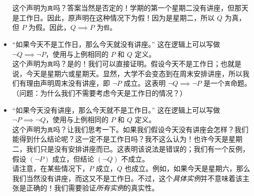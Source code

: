 \begin{example}
\begin{itemize}
            这个声明为\verb|真|吗？答案当然是否定的！学期的第一个星期二没有讲座，但那天是工作日。因此，原声明在这种情况下为假！因为是星期二，所以 $Q$ 为真，但 $P$ 为假。因此，$Q \implies P$ 为\verb|假|。
        \item ``如果今天不是工作日，那么今天就没有讲座。''
            这在逻辑上可以写做 $\neg Q \implies \neg P$，使用与上例相同的 $P$ 和 $Q$ 定义。\\
            这个声明为\verb|真|吗？是的！我们可以直接证明。假设今天不是工作日；也就是说，今天是星期六或星期天。显然，大学不会变态到在周末安排讲座，所以我们有理由声明周末没有讲座，即 $\neg P$ 成立。这表明 $\neg Q \implies \neg P$ 是一个\verb|真|命题。\\
            （问题：为什么我们不需要考虑今天是工作日的情况？）
        \item ``如果今天没有讲座，那么今天就不是工作日。''
            这在逻辑上可以写做 $\neg P \implies \neg Q$，使用与上例相同的 $P$ 和 $Q$ 定义。\\
            这个声明为\verb|真|吗？让我们思考一下。如果我们假设今天没有讲座会怎样？我们能得到什么结论呢？这一定不是工作日吗？我不这么认为！也许今天是星期二，我们只是没有安排讲座而已。这表明该说法是错误的；我们有一个反例，假设 $(\neg P)$ 成立，但结论 $(\neg Q)$ 不成立。\\
            请注意，在某些情况下，$P$ 成立，$Q$ 也成立。例如，如果今天是星期六，那么我们当然没有讲座，而这又不是工作日。不过，这个\emph{具体实例}并不意味着该主张是正确的！我们需要验证\emph{所有实例}的真实性。
    \end{itemize}
\end{example}

